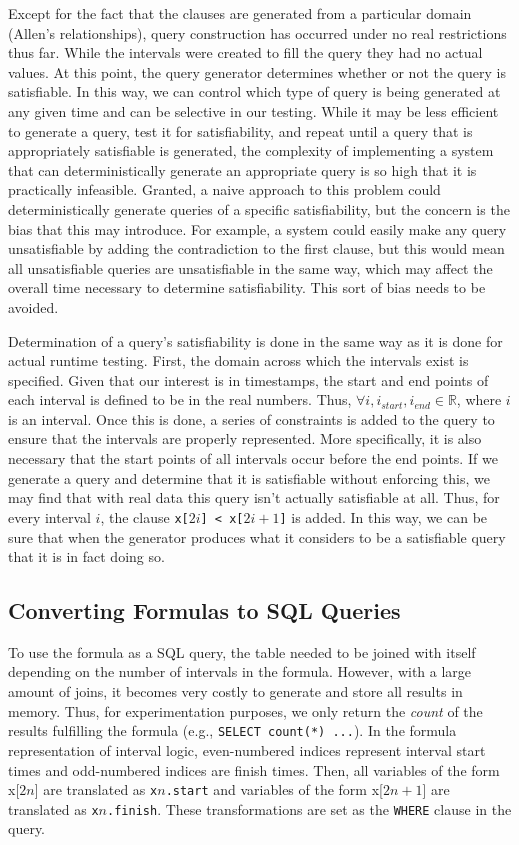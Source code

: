 \documentclass{achemso}
\begin{document}
Except for the fact that the clauses are generated from a particular domain (Allen's relationships), query construction has occurred under no real restrictions thus far.  While the intervals were created to fill the query they had no actual values.  At this point, the query generator determines whether or not the query is satisfiable.  In this way, we can control which type of query is being generated at any given time and can be selective in our testing.  While it may be less efficient to generate a query, test it for satisfiability, and repeat until a query that is appropriately satisfiable is generated, the complexity of implementing a system that can deterministically generate an appropriate query is so high that it is practically infeasible.  Granted, a naive approach to this problem could deterministically generate queries of a specific satisfiability, but the concern is the bias that this may introduce.  For example, a system could easily make any query unsatisfiable by adding the contradiction to the first clause, but this would mean all unsatisfiable queries are unsatisfiable in the same way, which may affect the overall time necessary to determine satisfiability.  This sort of bias needs to be avoided.

Determination of a query's satisfiability is done in the same way as it is done for actual runtime testing.  First, the domain across which the intervals exist is specified.  Given that our interest is in timestamps, the start and end points of each interval is defined to be in the real numbers.  Thus, $\forall i, i_{start}, i_{end} \in \mathbb{R}$, where $i$ is an interval.  Once this is done, a series of constraints is added to the query to ensure that the intervals are properly represented.  More specifically, it is also necessary that the start points of all intervals occur before the end points.  If we generate a query and determine that it is satisfiable without enforcing this, we may find that with real data this query isn't actually satisfiable at all.  Thus, for every interval $i$, the clause \texttt{x[$2i$] < x[$2i+1$]} is added.  In this way, we can be sure that when the generator produces what it considers to be a satisfiable query that it is in fact doing so. 

\subsection{Converting Formulas to SQL Queries}
To use the formula as a SQL query, the table needed to be joined with itself depending on the number of intervals in the formula. However, with a large amount of joins, it becomes very costly to generate and store all results in memory. Thus, for experimentation purposes, we only return the \textit{count} of the results fulfilling the formula (e.g., \texttt{SELECT count(*) ...}). In the formula representation of interval logic, even-numbered indices represent interval start times and odd-numbered indices are finish times. Then, all variables of the form x[$2n$] are translated as \texttt{x$n$.start} and variables of the form x[$2n+1$] are translated as \texttt{x$n$.finish}. These transformations are set as the \texttt{WHERE} clause in the query.
\end{document}
